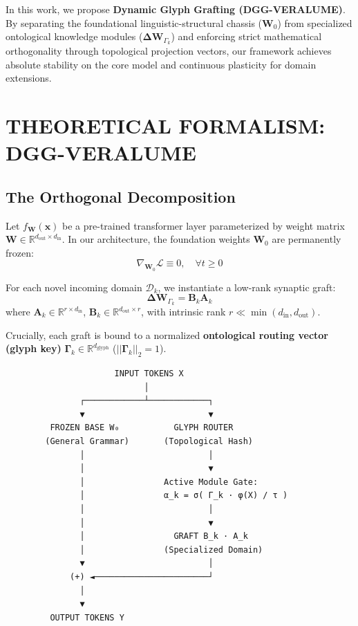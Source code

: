 \documentclass[10pt,twocolumn]{article}
\begin{document}
In this work, we propose \textbf{Dynamic Glyph Grafting (DGG-VERALUME)}. By separating the foundational linguistic-structural chassis ($\mathbf{W}_0$) from specialized ontological knowledge modules ($\mathbf{\Delta W}_{\Gamma_k}$) and enforcing strict mathematical orthogonality through topological projection vectors, our framework achieves absolute stability on the core model and continuous plasticity for domain extensions.



\section{THEORETICAL FORMALISM: DGG-VERALUME}


\subsection{The Orthogonal Decomposition}

Let $f_{\mathbf{W}}(\mathbf{x})$ be a pre-trained transformer layer parameterized by weight matrix $\mathbf{W} \in \mathbb{R}^{d_{\text{out}} \times d_{\text{in}}}$. In our architecture, the foundation weights $\mathbf{W}_0$ are permanently frozen:
\begin{equation}
  \nabla_{\mathbf{W}_0} \mathcal{L} \equiv 0, \quad \forall t \ge 0
\end{equation}

For each novel incoming domain $\mathcal{D}_k$, we instantiate a low-rank synaptic graft:
\begin{equation}
  \mathbf{\Delta W}_{\Gamma_k} = \mathbf{B}_k \mathbf{A}_k
\end{equation}
where $\mathbf{A}_k \in \mathbb{R}^{r \times d_{\text{in}}}$, $\mathbf{B}_k \in \mathbb{R}^{d_{\text{out}} \times r}$, with intrinsic rank $r \ll \min(d_{\text{in}}, d_{\text{out}})$.

Crucially, each graft is bound to a normalized \textbf{ontological routing vector (glyph key)} $\mathbf{\Gamma}_k \in \mathbb{R}^{d_{\text{glyph}}}$ ($||\mathbf{\Gamma}_k||_2 = 1$).

\begin{verbatim}
                      INPUT TOKENS X
                            │
               ┌────────────┴────────────┐
               ▼                         ▼
         FROZEN BASE W₀           GLYPH ROUTER
        (General Grammar)       (Topological Hash)
               │                         │
               │                         ▼
               │                Active Module Gate:
               │                α_k = σ( Γ_k · φ(X) / τ )
               │                         │
               │                         ▼
               │                  GRAFT B_k · A_k
               │                (Specialized Domain)
               ▼                         │
             (+) ◄───────────────────────┘
               │
               ▼
         OUTPUT TOKENS Y
\end{verbatim}
\end{document}
